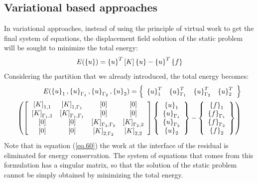 \subsection{Variational based approaches}\label{ssec34}
In variational approaches, instead of using the principle of virtual work to get the final system of equations, the displacement field solution of the static problem will be sought to minimize the total energy:
\begin{equation}
\label{eq.59}
E(\left\lbrace{u}\right \rbrace)=\left\lbrace{u}\right \rbrace^T\left[{K}\right]\left\lbrace{u}\right \rbrace-\left\lbrace{u}\right \rbrace^T\left\lbrace{f}\right \rbrace
\end{equation}
Considering the partition that we already introduced, the total energy becomes:
\begin{equation}
\label{eq.60}
\begin{aligned}
E( \left\lbrace{u}\right \rbrace_1,\left\lbrace{u}\right \rbrace_{\Gamma_1},\left\lbrace{u}\right \rbrace_{\Gamma_2},\left\lbrace{u}\right \rbrace_2
    )=\left\lbrace\begin{array}{cccc} \left\lbrace{u}\right \rbrace_1^T&\left\lbrace{u}\right \rbrace_{\Gamma_1}^T&\left\lbrace{u}\right \rbrace_{\Gamma_2}^T&\left\lbrace{u}\right \rbrace_2^T
    \end{array}\right\rbrace \\\left(\left[ \begin{array}{cccc} 
    \left[{K}\right]_{1,1} & \left[{K}\right]_{1,\Gamma_1} & \left[{0}\right]& \left[{0}\right] \\
   \left[{K}\right]_{\Gamma_1,1} & \left[{K}\right]_{\Gamma_1,\Gamma_1} & \left[{0}\right]& \left[{0}\right]\\ \left[{0}\right]& \left[{0}\right]& \left[{K}\right]_{\Gamma_2,\Gamma_2}&\left[{K}\right]_{\Gamma_2,2}\\   
    \left[{0}\right] & \left[{0}\right]& \left[{K}\right]_{2,\Gamma_2} & \left[{K}\right]_{2,2}\end{array} \right]\left\lbrace\begin{array}{c} \left\lbrace{u}\right \rbrace_1\\\left\lbrace{u}\right \rbrace_{\Gamma_1}\\\left\lbrace{u}\right \rbrace_{\Gamma_2}\\\left\lbrace{u}\right \rbrace_2
    \end{array}\right\rbrace
    -\left\lbrace\begin{array}{c} \left\lbrace{f}\right \rbrace_1\\\left\lbrace{f}\right \rbrace_{\Gamma_1}\\\left\lbrace{f}\right \rbrace_{\Gamma_2}\\\left\lbrace{f}\right \rbrace_2
    \end{array}\right\rbrace\right)
\end{aligned}
\end{equation}
Note that in equation (\ref{eq.60}) the work at the interface of the residual is eliminated for energy conservation. The system of equations that comes from this formulation has a singular matrix, so that the solution of the static problem cannot be simply obtained by minimizing the total energy.
